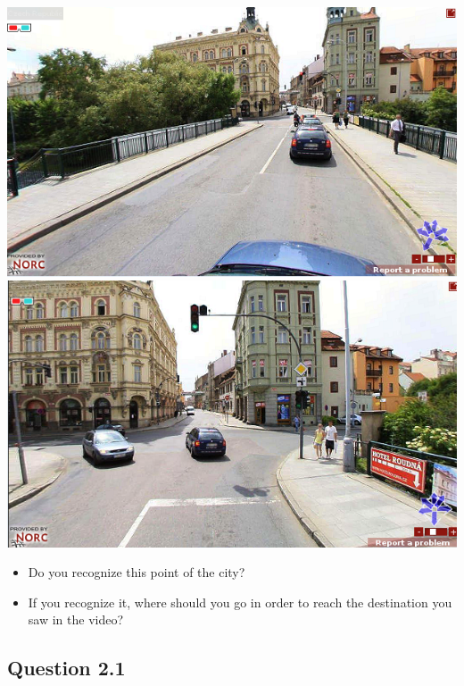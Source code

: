 \documentclass[12pt,a4paper,openright, notitlepage]{report}
\begin{document}
\includegraphics[width=\textwidth]{imgs/image-question13-1}
\includegraphics[width=\textwidth]{imgs/image-question13-2}

\begin{itemize}
	\item Do you recognize this point of the city?
	\item If you recognize it, where should you go in order to reach the destination you saw in the video?
\end{itemize}

\newpage

\subsection{Question 2.1}
\end{document}
